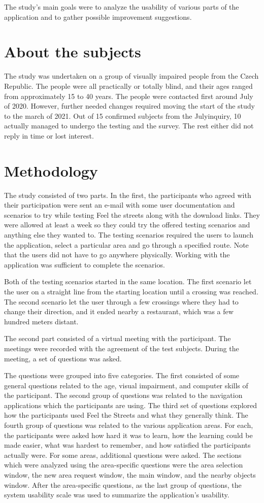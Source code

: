 \documentclass[nolof,digital]{fithesis3}
\begin{document}
The study's main goals were to analyze the usability of various parts of the application and to gather possible improvement suggestions.
\section{About the subjects}
The study was undertaken on a group of visually impaired people from the Czech Republic. The people were all practically or totally blind, and their ages ranged from approximately 15 to 40 years. The people were contacted first around July of 2020. However, further needed changes required moving the start of the study to the march of 2021. Out of 15 confirmed subjects from the Julyinquiry, 10 actually managed to undergo the testing and the survey. The rest either did not reply in time or lost interest.
\section{Methodology}
The study consisted of two parts. In the first, the participants who agreed with their participation were sent an e-mail with some user documentation and scenarios to try while testing Feel the streets along with the download links. They were allowed at least a week so they could try the offered testing scenarios and anything else they wanted to. The testing scenarios required the users to launch the application, select a particular area and go through a specified route. Note that the users did not have to go anywhere physically. Working with the application was sufficient to complete the scenarios.

Both of the testing scenarios started in the same location. The first scenario let the user on a straight line from the starting location until a crossing was reached. The second scenario let the user through a few crossings where they had to change their direction, and it ended nearby a restaurant, which was a few hundred meters distant.

The second part consisted of a virtual meeting with the participant. The meetings were recorded with the agreement of the test subjects. During the meeting, a set of questions was asked.

The questions were grouped into five categories. The first consisted of some general questions related to the age, visual impairment, and computer skills of the participant. The second group of questions was related to the navigation applications which the participants are using. The third set of questions explored how the participants used Feel the Streets and what they generally think. The fourth group of questions was related to the various application areas. For each, the participants were asked how hard it was to learn, how the learning could be made easier, what was hardest to remember, and how satisfied the participants actually were. For some areas, additional questions were asked. The sections which were analyzed using the area-specific questions were the area selection window, the new area request window, the main window, and the nearby objects window. After the area-specific questions, as the last group of questions, the system usability scale \parencite{brooke1996} was used to summarize the application's usability.
\end{document}
